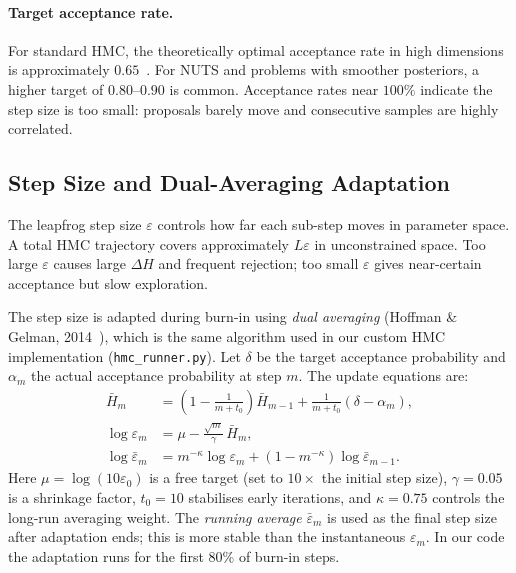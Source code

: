 \documentclass{article}
\begin{document}
\paragraph{Target acceptance rate.}
For standard HMC, the theoretically optimal acceptance rate in high dimensions is approximately
$0.65$~\cite{beskos2013optimal}.  For NUTS and problems with smoother posteriors, a higher target
of $0.80$--$0.90$ is common.  Acceptance rates near $100\%$ indicate the step size is too small:
proposals barely move and consecutive samples are highly correlated.

\subsection{Step Size and Dual-Averaging Adaptation}

The leapfrog step size $\varepsilon$ controls how far each sub-step moves in parameter space.
A total HMC trajectory covers approximately $L\varepsilon$ in unconstrained space.  Too large
$\varepsilon$ causes large $\Delta H$ and frequent rejection; too small $\varepsilon$ gives
near-certain acceptance but slow exploration.

The step size is adapted during burn-in using \emph{dual averaging} (Hoffman \& Gelman,
2014~\cite{hoffman2014nuts}), which is the same algorithm used in our custom HMC implementation
(\texttt{hmc\_runner.py}).  Let $\delta$ be the target acceptance probability and $\alpha_m$ the
actual acceptance probability at step $m$.  The update equations are:
\begin{align}
  \bar{H}_m &= \left(1 - \frac{1}{m + t_0}\right)\bar{H}_{m-1}
              + \frac{1}{m + t_0}(\delta - \alpha_m),
              \label{eq:da_hbar}\\[4pt]
  \log \varepsilon_m &= \mu - \frac{\sqrt{m}}{\gamma}\,\bar{H}_m,
              \label{eq:da_eps}\\[4pt]
  \log \bar{\varepsilon}_m &= m^{-\kappa}\log \varepsilon_m
              + (1 - m^{-\kappa})\log \bar{\varepsilon}_{m-1}.
              \label{eq:da_epsbar}
\end{align}
Here $\mu = \log(10\varepsilon_0)$ is a free target (set to $10\times$ the initial step size),
$\gamma = 0.05$ is a shrinkage factor, $t_0 = 10$ stabilises early iterations, and $\kappa = 0.75$
controls the long-run averaging weight.  The \emph{running average} $\bar{\varepsilon}_m$ is
used as the final step size after adaptation ends; this is more stable than the instantaneous
$\varepsilon_m$.  In our code the adaptation runs for the first $80\%$ of burn-in steps.
\end{document}

